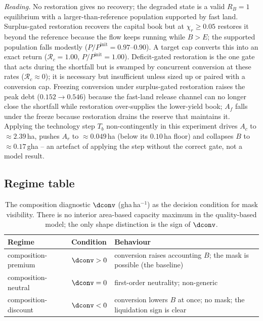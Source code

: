 \noindent\emph{Reading.} No restoration gives no recovery; the degraded state is a valid $R_B=1$ equilibrium with a larger-than-reference population supported by fast land. Surplus-gated restoration recovers the capital book but at $\chi_r\ge0.05$ restores it beyond the reference because the flow keeps running while $B>E$; the supported population falls modestly ($P/P^{\mathrm{init}}=0.97$--$0.90$). A target cap converts this into an exact return ($\mathcal R_c=1.00$, $P/P^{\mathrm{init}}=1.00$). Deficit-gated restoration is the one gate that acts during the shortfall but is swamped by concurrent conversion at these rates ($\mathcal R_c\approx0$); it is necessary but insufficient unless sized up or paired with a conversion cap. Freezing conversion under surplus-gated restoration raises the peak debt ($0.152\to0.546$) because the fast-land release channel can no longer close the shortfall while restoration over-supplies the lower-yield book; $A_f$ falls under the freeze because restoration drains the reserve that maintains it. Applying the technology step $T_b$ non-contingently in this experiment drives $A_c$ to $\approx2.39$\,ha, pushes $A_r$ to $\approx0.049$\,ha (below its $0.10$\,ha floor) and collapses $B$ to $\approx0.17$\,gha -- an artefact of applying the step without the correct gate, not a model result.

\subsection{Regime table}\label{si:regimes}

\begin{table}[H]
\centering\small
\caption{The composition diagnostic $\dconv$ (gha\,ha$^{-1}$) as the decision condition for mask visibility. There is no interior area-based capacity maximum in the quality-based model; the only shape distinction is the sign of $\dconv$.}
\label{tab:si_regime}
\begin{tabularx}{\textwidth}{l l X}
\toprule
Regime & Condition & Behaviour \\
\midrule
composition-premium & $\dconv>0$ & conversion raises accounting $B$; the mask is possible (the baseline) \\
composition-neutral & $\dconv=0$ & first-order neutrality; non-generic \\
composition-discount & $\dconv<0$ & conversion lowers $B$ at once; no mask; the liquidation sign is clear \\
\bottomrule
\end{tabularx}
\end{table}

